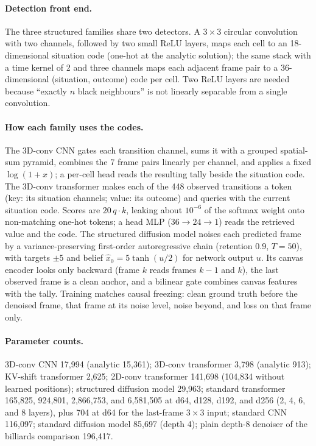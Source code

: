 \documentclass[11pt]{article}
\begin{document}
\paragraph{Detection front end.}
The three structured families share two detectors. A $3{\times}3$ circular convolution with two channels, followed by two small ReLU layers, maps each cell to an 18-dimensional situation code (one-hot at the analytic solution); the same stack with a time kernel of 2 and three channels maps each adjacent frame pair to a 36-dimensional (situation, outcome) code per cell. Two ReLU layers are needed because ``exactly $n$ black neighbours'' is not linearly separable from a single convolution.

\paragraph{How each family uses the codes.}
The 3D-conv CNN gates each transition channel, sums it with a grouped spatial-sum pyramid, combines the 7 frame pairs linearly per channel, and applies a fixed $\log(1+x)$; a per-cell head reads the resulting tally beside the situation code. The 3D-conv transformer makes each of the 448 observed transitions a token (key: its situation channels; value: its outcome) and queries with the current situation code. Scores are $20\,q\cdot k$, leaking about $10^{-6}$ of the softmax weight onto non-matching one-hot tokens; a head MLP ($36\to24\to1$) reads the retrieved value and the code. The structured diffusion model noises each predicted frame by a variance-preserving first-order autoregressive chain (retention 0.9, $T=50$), with targets $\pm5$ and belief $\hat{x}_0=5\tanh(u/2)$ for network output $u$. Its canvas encoder looks only backward (frame $k$ reads frames $k{-}1$ and $k$), the last observed frame is a clean anchor, and a bilinear gate combines canvas features with the tally. Training matches causal freezing: clean ground truth before the denoised frame, that frame at its noise level, noise beyond, and loss on that frame only.

\paragraph{Parameter counts.}
3D-conv CNN 17{,}994 (analytic 15{,}361); 3D-conv transformer 3{,}798 (analytic 913); KV-shift transformer 2{,}625; 2D-conv transformer 141{,}698 (104{,}834 without learned positions); structured diffusion model 29{,}963; standard transformer 165{,}825, 924{,}801, 2{,}866{,}753, and 6{,}581{,}505 at d64, d128, d192, and d256 (2, 4, 6, and 8 layers), plus 704 at d64 for the last-frame $3{\times}3$ input; standard CNN 116{,}097; standard diffusion model 85{,}697 (depth 4); plain depth-8 denoiser of the billiards comparison 196{,}417.
\end{document}
